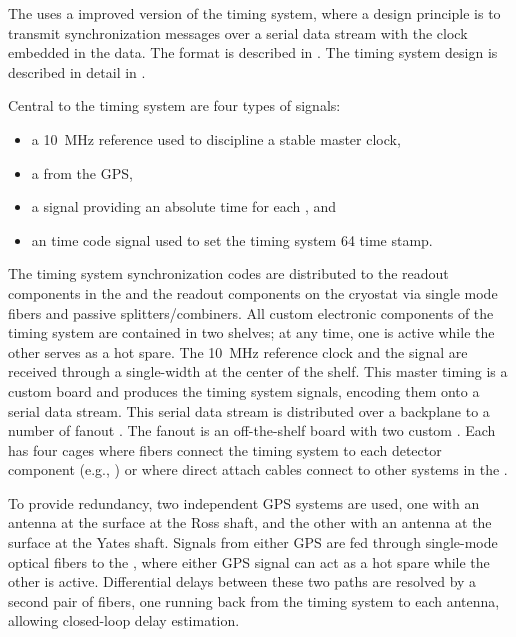 The   uses a improved version of the  timing
system, where a design principle is to transmit synchronization messages over
a serial data stream with the clock embedded in the data. The format
is described in . The timing system design is
described in detail in .

Central to the timing system are four types of signals:
\begin{itemize}
\item a \SI{10}{\mega\hertz} reference used to discipline a stable master clock,
\item a  from the GPS,
\item a  signal providing an absolute time for each , and
\item an  time code signal
  used to set the timing system \SI{64}{\bit} time stamp.
\end{itemize}

The timing system synchronization codes are distributed to the  readout components in the  and the readout components on the cryostat via single mode fibers and passive splitters/combiners.
All custom electronic components of the timing system are contained in two  shelves; at any time, one is active while the other serves as a hot spare.
The \SI{10}{MHz} reference clock and the  signal are received through a single-width  at the center of the  shelf.
This master timing  is a custom board and produces the timing system signals, encoding them onto a serial data stream.
This serial data stream is distributed over a backplane to a number of fanout .
The fanout  is an off-the-shelf board with two custom .
Each  has four  cages where fibers connect the timing system to each detector component (e.g., ) or where direct attach cables connect to other systems in the .

To provide redundancy, two independent GPS systems are used,
one with an antenna at the surface at the Ross shaft, and the other
with an antenna at the surface at the Yates shaft. Signals from either
GPS are fed through single-mode optical fibers to the , where
either GPS signal can act as a hot spare while the other is active. 
Differential delays between these two paths are resolved by a second pair of fibers, one running back from the timing system to each antenna, allowing closed-loop delay estimation.


